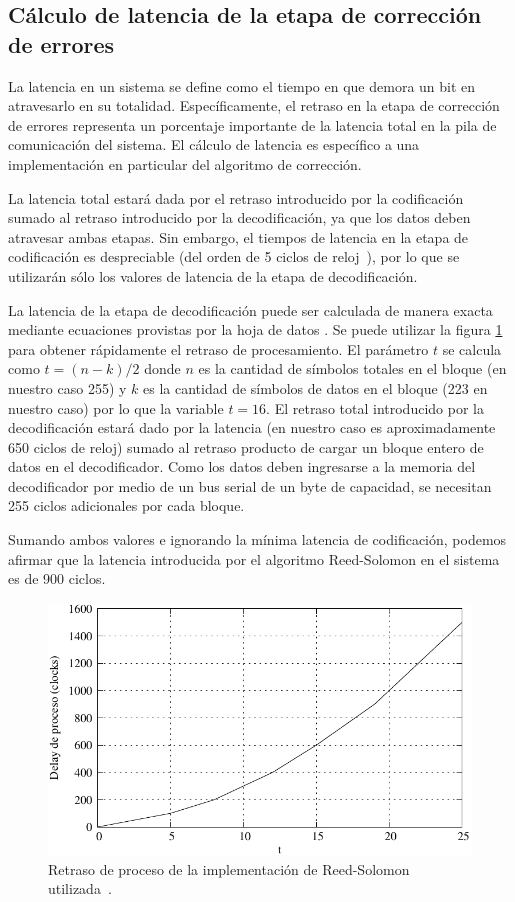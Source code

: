 \subsection{Cálculo de latencia de la etapa de corrección de errores}
La latencia en un sistema se define como el tiempo en que demora un bit en atravesarlo en su totalidad. Específicamente, el retraso en la etapa de corrección de errores representa un porcentaje importante de la latencia total en la pila de comunicación del sistema. El cálculo de latencia es específico a una implementación en particular del algoritmo de corrección.

La latencia total estará dada por el retraso introducido por la codificación sumado al retraso introducido por la decodificación, ya que los datos deben atravesar ambas etapas. Sin embargo, el tiempos de latencia en la etapa de codificación es despreciable (del orden de 5 ciclos de reloj~\cite{Xilinx:DS251}), por lo que se utilizarán sólo los valores de latencia de la etapa de decodificación. 

La latencia de la etapa de decodificación puede ser calculada de manera exacta mediante ecuaciones provistas por la hoja de datos \cite{Xilinx:DS252}. Se puede utilizar la figura \ref{fig_rslat} para obtener rápidamente el retraso de procesamiento. El parámetro $t$ se calcula como $t=(n-k)/2$ donde $n$ es la cantidad de símbolos totales en el bloque (en nuestro caso 255) y $k$ es la cantidad de símbolos de datos en el bloque (223 en nuestro caso) por lo que la variable $t=16$.  El retraso total introducido por la decodificación estará dado por la latencia (en nuestro caso es aproximadamente 650 ciclos de reloj) sumado al retraso producto de cargar un bloque entero de datos en el decodificador. Como los datos deben ingresarse a la memoria del decodificador por medio de un bus serial de un byte de capacidad, se necesitan 255 ciclos adicionales por cada bloque. 

Sumando ambos valores e ignorando la mínima latencia de codificación, podemos afirmar que la latencia introducida por el algoritmo Reed-Solomon en el sistema es de 900 ciclos.

\begin{figure}[t]
  \centering
  \includegraphics[width=0.6 \textwidth]{graphs/rsDelay.pdf} 
  \caption{Retraso de proceso de la implementación de Reed-Solomon utilizada~\cite{Xilinx:DS252}.}
  \label{fig_rslat}
\end{figure}


